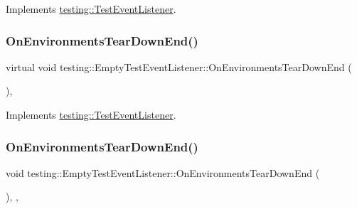 Implements \mbox{\hyperlink{classtesting_1_1_test_event_listener_aa6502e534919605be45f26a6daf9a40c}{testing\+::\+Test\+Event\+Listener}}.

\mbox{\label{classtesting_1_1_empty_test_event_listener_aea64c83c415b33a4c0b0239bafd1438d}} 
\subsubsection{\texorpdfstring{OnEnvironmentsTearDownEnd()}{OnEnvironmentsTearDownEnd()}\hspace{0.1cm}{\footnotesize\ttfamily [1/3]}}
{\footnotesize\ttfamily virtual void testing\+::\+Empty\+Test\+Event\+Listener\+::\+On\+Environments\+Tear\+Down\+End (\begin{DoxyParamCaption}\item[{const \mbox{\hyperlink{classtesting_1_1_unit_test}{Unit\+Test}} \&}]{ }\end{DoxyParamCaption})\hspace{0.3cm}{\ttfamily [inline]}, {\ttfamily [virtual]}}



Implements \mbox{\hyperlink{classtesting_1_1_test_event_listener_a9ea04fa7f447865ba76df35e12ba2092}{testing\+::\+Test\+Event\+Listener}}.

\mbox{\label{classtesting_1_1_empty_test_event_listener_ad9984052e82c3ae26395a2d9480326d2}} 
\subsubsection{\texorpdfstring{OnEnvironmentsTearDownEnd()}{OnEnvironmentsTearDownEnd()}\hspace{0.1cm}{\footnotesize\ttfamily [2/3]}}
{\footnotesize\ttfamily void testing\+::\+Empty\+Test\+Event\+Listener\+::\+On\+Environments\+Tear\+Down\+End (\begin{DoxyParamCaption}\item[{const \mbox{\hyperlink{classtesting_1_1_unit_test}{Unit\+Test}} \&}]{ }\end{DoxyParamCaption})\hspace{0.3cm}{\ttfamily [inline]}, {\ttfamily [override]}, {\ttfamily [virtual]}}



